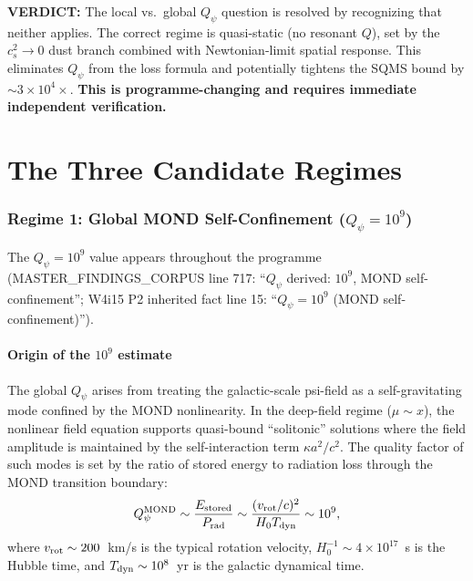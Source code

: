 \documentclass[11pt]{article}
\newcommand{\Qpsi}{Q_\psi}
\newcommand{\ee}[1]{\times 10^{#1}}
\newcommand{\verdict}[1]{\textcolor{green!50!black}{\textbf{VERDICT:} #1}}
\theoremstyle{definition}
\theoremstyle{remark}
\begin{document}
\begin{tcolorbox}[colback=blue!5!white, colframe=blue!60!black,
  title=\textbf{W4i16 --- $Q_\psi$ LOCAL vs GLOBAL: RESOLUTION}]
\verdict{The local vs.\ global $\Qpsi$ question is resolved by
recognizing that neither applies. The correct regime is quasi-static
(no resonant $Q$), set by the $c_s^2 \to 0$ dust branch combined with
Newtonian-limit spatial response. This eliminates $\Qpsi$ from the
loss formula and potentially tightens the SQMS bound by $\sim
3\ee{4}\times$. \textbf{This is programme-changing and requires
immediate independent verification.}}
\end{tcolorbox}


\part{The Three Candidate Regimes}
\label{part:regimes}


\section{Regime 1: Global MOND Self-Confinement ($\Qpsi = 10^9$)}
\label{sec:regime1}

The $\Qpsi = 10^9$ value appears throughout the programme (MASTER\_FINDINGS\_CORPUS
line 717: ``$Q_\psi$ derived: $10^9$, MOND self-confinement''; W4i15 P2 inherited
fact line 15: ``$Q_\psi = 10^9$ (MOND self-confinement)'').

\subsection{Origin of the $10^9$ estimate}

The global $\Qpsi$ arises from treating the galactic-scale psi-field
as a self-gravitating mode confined by the MOND nonlinearity. In the
deep-field regime ($\mu \sim x$), the nonlinear field equation
supports quasi-bound ``solitonic'' solutions where the field amplitude
is maintained by the self-interaction term $\kappa a^2/c^2$. The
quality factor of such modes is set by the ratio of stored energy to
radiation loss through the MOND transition boundary:
\begin{equation}
\Qpsi^{\rm MOND} \sim \frac{E_{\rm stored}}{P_{\rm rad}}
\sim \frac{(v_{\rm rot}/c)^2}{H_0 T_{\rm dyn}} \sim 10^9,
\end{equation}
where $v_{\rm rot} \sim 200$~km/s is the typical rotation velocity,
$H_0^{-1} \sim 4\ee{17}$~s is the Hubble time, and $T_{\rm dyn}
\sim 10^8$~yr is the galactic dynamical time.
\end{document}
